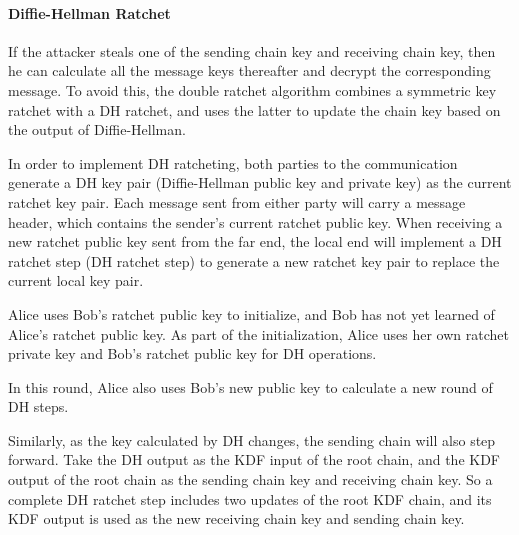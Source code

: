 \documentclass[11pt,en]{elegantpaper}
\begin{document}
\paragraph{Diffie-Hellman Ratchet}
If the attacker steals one of the sending chain key and receiving chain key, then he can calculate all the message keys thereafter and decrypt the corresponding message. To avoid this, the double ratchet algorithm combines a symmetric key ratchet with a DH ratchet, and uses the latter to update the chain key based on the output of Diffie-Hellman.

In order to implement DH ratcheting, both parties to the communication generate a DH key pair (Diffie-Hellman public key and private key) as the current ratchet key pair. Each message sent from either party will carry a message header, which contains the sender's current ratchet public key. When receiving a new ratchet public key sent from the far end, the local end will implement a DH ratchet step (DH ratchet step) to generate a new ratchet key pair to replace the current local key pair.

Alice uses Bob's ratchet public key to initialize, and Bob has not yet learned of Alice's ratchet public key. As part of the initialization, Alice uses her own ratchet private key and Bob's ratchet public key for DH operations.

In this round, Alice also uses Bob's new public key to calculate a new round of DH steps.

Similarly, as the key calculated by DH changes, the sending chain will also step forward. Take the DH output as the KDF input of the root chain, and the KDF output of the root chain as the sending chain key and receiving chain key. So a complete DH ratchet step includes two updates of the root KDF chain, and its KDF output is used as the new receiving chain key and sending chain key.

\pa



\end{document}
